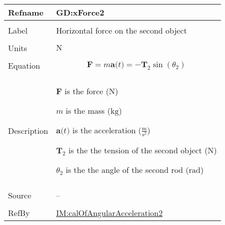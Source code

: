 \documentclass[12pt]{article}
\begin{document}
\begin{minipage}{\textwidth}
\begin{tabular}{>{\raggedright}p{}>{\raggedright\arraybackslash}p{}}
\toprule \textbf{Refname} & \textbf{GD:xForce2}
\label{GD:xForce2}
\\ \midrule \\
Label & Horizontal force on the second object
        
\\ \midrule \\
Units & ${\text{N}}$
        
\\ \midrule \\
Equation & \begin{displaymath}
           \symbf{F}=m \symbf{a}\text{(}t\text{)}=-{\symbf{T}_{2}} \sin\left({θ_{2}}\right)
           \end{displaymath}
\\ \midrule \\
Description & \begin{symbDescription}
              \item{$\symbf{F}$ is the force (${\text{N}}$)}
              \item{$m$ is the mass (${\text{kg}}$)}
              \item{$\symbf{a}\text{(}t\text{)}$ is the acceleration ($\frac{\text{m}}{\text{s}^{2}}$)}
              \item{${\symbf{T}_{2}}$ is the the tension of the second object (${\text{N}}$)}
              \item{${θ_{2}}$ is the the angle of the second rod (${\text{rad}}$)}
              \end{symbDescription}
\\ \midrule \\
Source & --
         
\\ \midrule \\
RefBy & \hyperref[IM:calOfAngularAcceleration2]{IM:calOfAngularAcceleration2}
        
\\ \bottomrule
\end{tabular}
\end{minipage}
\end{document}
